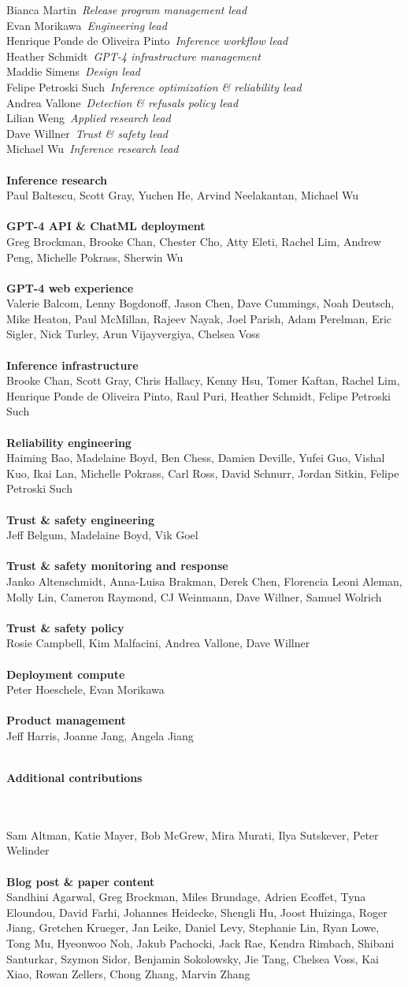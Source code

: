 \documentclass{article}
\newcommand{\creditsectionheader}[1]{\parbox{\columnwidth}{\centering \textbf{\small #1}}\\}
\newcommand{\creditlistheader}[1]{\textbf{#1}\footnotemark[\thefootnote]\\}
\newcommand{\creditlist}[2]{\creditlistheader{#1}#2\\
\\}
\newcommand{\corecontributor}[2]{#1\ \textit{#2}\\}
\begin{document}
\begin{multicols}{2}
\corecontributor{Bianca Martin}{Release program management lead}
\corecontributor{Evan Morikawa}{Engineering lead}
\corecontributor{Henrique Ponde de Oliveira Pinto}{Inference workflow lead}
\corecontributor{Heather Schmidt}{GPT-4 infrastructure management}
\corecontributor{Maddie Simens}{Design lead}
\corecontributor{Felipe Petroski Such}{Inference optimization \& reliability lead}
\corecontributor{Andrea Vallone}{Detection \& refusals policy lead}
\corecontributor{Lilian Weng}{Applied research lead}
\corecontributor{Dave Willner}{Trust \& safety lead}
\corecontributor{Michael Wu}{Inference research lead}
\\
\creditlist{Inference research}{Paul Baltescu, Scott Gray, Yuchen He, Arvind Neelakantan, Michael Wu}
\creditlist{GPT-4 API \& ChatML deployment}{Greg Brockman, Brooke Chan, Chester Cho, Atty Eleti, Rachel Lim, Andrew Peng, Michelle Pokrass, Sherwin Wu}
\creditlist{GPT-4 web experience}{Valerie Balcom, Lenny Bogdonoff, Jason Chen, Dave Cummings, Noah Deutsch, Mike Heaton, Paul McMillan, Rajeev Nayak, Joel Parish, Adam Perelman, Eric Sigler, Nick Turley, Arun Vijayvergiya, Chelsea Voss}
\creditlist{Inference infrastructure}{Brooke Chan, Scott Gray, Chris Hallacy, Kenny Hsu, Tomer Kaftan, Rachel Lim, Henrique Ponde de Oliveira Pinto, Raul Puri, Heather Schmidt, Felipe Petroski Such}
\creditlist{Reliability engineering}{Haiming Bao, Madelaine Boyd, Ben Chess, Damien Deville, Yufei Guo, Vishal Kuo, Ikai Lan, Michelle Pokrass, Carl Ross, David Schnurr, Jordan Sitkin, Felipe Petroski Such}
\creditlist{Trust \& safety engineering}{Jeff Belgum, Madelaine Boyd, Vik Goel}
\creditlist{Trust \& safety monitoring and response}{Janko Altenschmidt, Anna-Luisa Brakman, Derek Chen, Florencia Leoni Aleman, Molly Lin, Cameron Raymond, CJ Weinmann, Dave Willner, Samuel Wolrich}
\creditlist{Trust \& safety policy}{Rosie Campbell, Kim Malfacini, Andrea Vallone, Dave Willner}
\creditlist{Deployment compute}{Peter Hoeschele, Evan Morikawa}
\creditlist{Product management}{Jeff Harris, Joanne Jang, Angela Jiang}
\creditsectionheader{Additional contributions}
\\
Sam Altman, Katie Mayer, Bob McGrew, Mira Murati, Ilya Sutskever, Peter Welinder\footnotemark[\thefootnote]\\
\\
\creditlist{Blog post \& paper content}{Sandhini Agarwal, Greg Brockman, Miles Brundage, Adrien Ecoffet, Tyna Eloundou, David Farhi, Johannes Heidecke, Shengli Hu, Joost Huizinga, Roger Jiang, Gretchen Krueger, Jan Leike, Daniel Levy, Stephanie Lin, Ryan Lowe, Tong Mu, Hyeonwoo Noh, Jakub Pachocki, Jack Rae, Kendra Rimbach, Shibani Santurkar, Szymon Sidor, Benjamin Sokolowsky, Jie Tang, Chelsea Voss, Kai Xiao, Rowan Zellers, Chong Zhang, Marvin Zhang}

\end{multicols}
\end{document}

